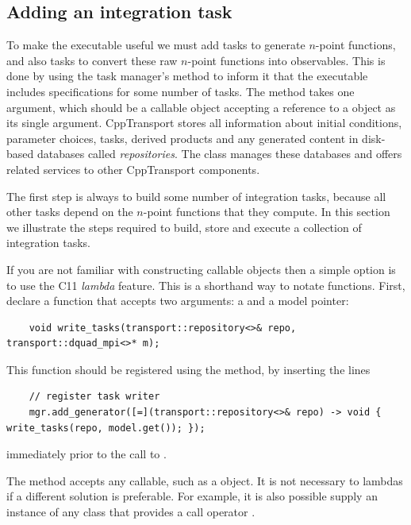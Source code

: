 \documentclass[11pt,a4paper]{article}
\renewcommand{\texttt}[1]{{\ttfamily\fontseries{l}\selectfont{#1}}}
\newcounter{advancedbox}[section]
\newenvironment{advanced}[1]{\stepcounter{advancedbox}\begin{tcolorbox}[enhanced,breakable,colback=red!10,colbacktitle=red!20,colframe=red!40,coltitle=black,title={Advanced usage: {#1}},fonttitle=\sffamily\fontseries{b}\selectfont]}{\end{tcolorbox}}
\newcommand{\packagefont}{\sffamily}
\newcommand{\CppTransport}{{\packagefont CppTransport}}
\newcommand{\file}[1]{\texttt{{#1}}}
\newcommand\CC{C\nolinebreak\hspace{-.05em}\raisebox{.4ex}{\relsize{-3}{\textbf{+}}}\nolinebreak\hspace{-.10em}\raisebox{.4ex}{\relsize{-3}{\textbf{+}}}}
\begin{document}
\subsection{Adding an integration task}
\label{sec:add-integration-task}
To make the executable \file{dquad} useful we must add tasks to generate
$n$-point functions, and also tasks to convert these raw $n$-point
functions into observables.
This is done by using the task manager's
\texttt{add_generator()}
method to inform it that the executable includes specifications
for some number of
tasks.
The \texttt{add_generator()}
method takes one argument, which should be a callable
object accepting a reference to
a \texttt{transport::repository<>}
object as its single argument.
{\CppTransport} stores all information about
initial conditions, parameter choices, tasks,
derived products and any generated content
in disk-based databases called \emph{repositories}.
The \texttt{repository<>} class manages
these databases and offers related services
to other
{\CppTransport} components.

The first step is always to build some number of integration tasks,
because all other tasks depend on the $n$-point functions that they compute.
In this section we illustrate the steps required to build, store and
execute a collection of integration tasks.

If you are not familiar with constructing callable objects
then a simple option is to use the {\CC}11 \emph{lambda} feature.
This is a shorthand way to notate functions.
First,  declare a function
\texttt{write_tasks()} that accepts
two arguments:
a \texttt{repository<>} and a model pointer:
\begin{verbatim}
    void write_tasks(transport::repository<>& repo, transport::dquad_mpi<>* m);
\end{verbatim}
This function should be registered using the
\texttt{add_generator()} method,
by inserting the lines
\begin{verbatim}
    // register task writer
    mgr.add_generator([=](transport::repository<>& repo) -> void { write_tasks(repo, model.get()); });
\end{verbatim}
immediately prior to the call to
\texttt{mgr.process()}.
\begin{advanced}{Callable objects}
    The \texttt{add_generator()} method accepts any callable,
    such as a \texttt{std::function<>} object.
    It is not necessary to lambdas
    if a different solution is preferable.
    For example, it is also possible supply an instance of any
    class that provides a call operator
    \texttt{operator()}.
\end{advanced}
\end{document}
